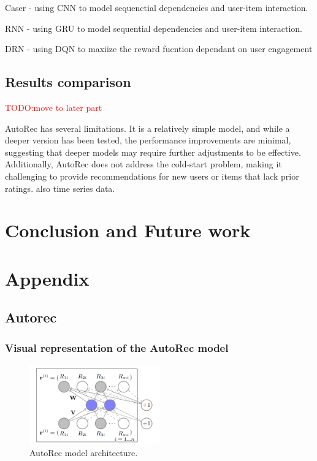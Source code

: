 \documentclass{ieeetj}
\begin{document}
Caser - using CNN to model sequenctial dependencies and user-item interaction.

RNN - using GRU to model sequential dependencies and user-item interaction.

DRN - using DQN to maxiize the reward fucntion dependant on user engagement 

\subsection{Results comparison}

\textcolor{red}{TODO:move to later part}

AutoRec has several limitations. It is a relatively simple model, and while a deeper version has been tested, the performance improvements are minimal, suggesting that deeper models may require further adjustments to be effective. Additionally, AutoRec does not address the cold-start problem, making it challenging to provide recommendations for new users or items that lack prior ratings. also time series data.

\section{Conclusion and Future work}
\vfill\pagebreak





\appendix
\section{Appendix}
\subsection{Autorec}
\subsubsection{Visual representation of the AutoRec model}
\begin{figure}[h]
\centering
\includegraphics[width=0.5\textwidth]{figures/autorec.png}
\caption{AutoRec model architecture.}
\label{fig:autorec}
\end{figure}
\end{document}

